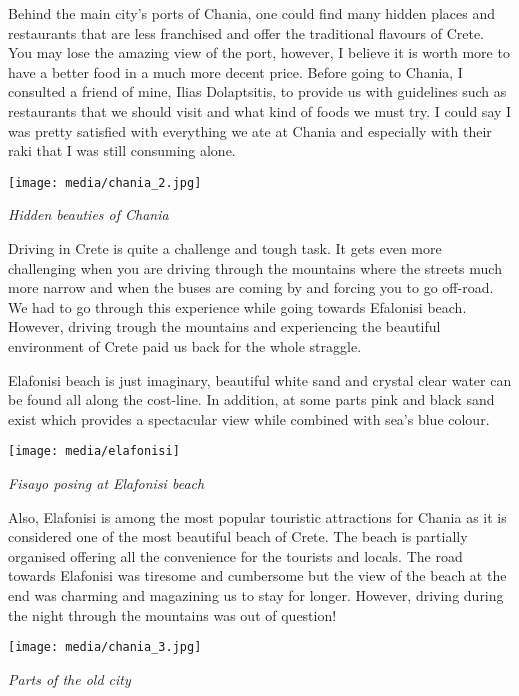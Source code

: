 \documentclass[10pt,a4paper]{article} %
\begin{document}
\begin{multicols}{3}
Behind the main city's ports of Chania, one could find many hidden places and 
restaurants that are less franchised and offer the traditional flavours of 
Crete. 
You may lose the amazing view of the port, however, I believe it is worth more 
to have a better food in a much more decent price. 
Before going to Chania, I consulted a friend of mine, Ilias Dolaptsitis, 
to provide us with guidelines such as restaurants that we should visit and what 
kind of foods we must try. 
I could say I was pretty satisfied with everything we ate at Chania and especially 
with their raki that I was still consuming alone. 

\begin{center}
	\texttt{[image: media/chania\_2.jpg]}
	\par\textit{Hidden beauties of Chania}
\end{center}

Driving in Crete is quite a challenge and tough task. 
It gets even more challenging when you are driving through the mountains 
where the streets much more narrow and when the buses are coming by and 
forcing you to go off-road. 
We had to go through this experience while going towards Efalonisi beach. 
However, driving trough the mountains and experiencing the beautiful environment 
of Crete paid us back for the whole straggle.

Elafonisi beach is just imaginary, beautiful white sand and crystal clear water 
can be found all along the cost-line. 
In addition, at some parts pink and black sand exist which provides a spectacular 
view while combined with sea's blue colour.

\begin{center}
	\texttt{[image: media/elafonisi]}
	\par\textit{Fisayo posing at Elafonisi beach}
\end{center}

Also, Elafonisi is among the most popular touristic attractions for Chania as it is considered 
one of the most beautiful beach of Crete. 
The beach is partially organised offering all the convenience for the tourists and 
locals. 
The road towards Elafonisi was tiresome and cumbersome but the view of the beach 
at the end was charming and magazining us to stay for longer. 
However, driving during the night through the mountains was out of question!

\begin{center}
	\texttt{[image: media/chania\_3.jpg]}
	\par\textit{Parts of the old city}
\end{center}


\end{multicols}
\end{document}

